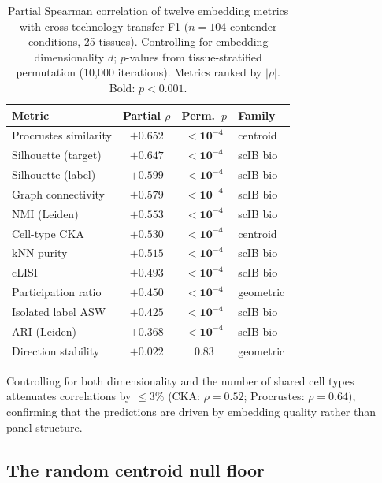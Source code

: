 \documentclass[11pt]{article}
\begin{document}
\begin{table}[t]
\centering
\caption{Partial Spearman correlation of twelve embedding metrics with
cross-technology transfer F1 ($n = 104$ contender conditions, 25
tissues). Controlling for embedding dimensionality $d$; $p$-values from
tissue-stratified permutation (10,000 iterations). Metrics ranked by
$|\rho|$. Bold: $p < 0.001$.}
\label{tab:metrics}
\small
\begin{tabular}{@{}lccl@{}}
\toprule
Metric & Partial $\rho$ & Perm.\ $p$ & Family \\
\midrule
Procrustes similarity   & $+0.652$ & $\mathbf{< 10^{-4}}$ & centroid \\
Silhouette (target)     & $+0.647$ & $\mathbf{< 10^{-4}}$ & scIB bio \\
Silhouette (label)      & $+0.599$ & $\mathbf{< 10^{-4}}$ & scIB bio \\
Graph connectivity      & $+0.579$ & $\mathbf{< 10^{-4}}$ & scIB bio \\
NMI (Leiden)            & $+0.553$ & $\mathbf{< 10^{-4}}$ & scIB bio \\
Cell-type CKA           & $+0.530$ & $\mathbf{< 10^{-4}}$ & centroid \\
kNN purity              & $+0.515$ & $\mathbf{< 10^{-4}}$ & scIB bio \\
cLISI                   & $+0.493$ & $\mathbf{< 10^{-4}}$ & scIB bio \\
Participation ratio     & $+0.450$ & $\mathbf{< 10^{-4}}$ & geometric \\
Isolated label ASW      & $+0.425$ & $\mathbf{< 10^{-4}}$ & scIB bio \\
ARI (Leiden)            & $+0.368$ & $\mathbf{< 10^{-4}}$ & scIB bio \\
Direction stability     & $+0.022$ & $0.83$               & geometric \\
\bottomrule
\end{tabular}
\end{table}

Controlling for both dimensionality and the number of shared cell types
attenuates correlations by $\leq 3\%$ (CKA: $\rho = 0.52$; Procrustes:
$\rho = 0.64$), confirming that the predictions are driven by embedding
quality rather than panel structure.


\subsection{The random centroid null floor}
\label{sec:nullfloor}
\end{document}
